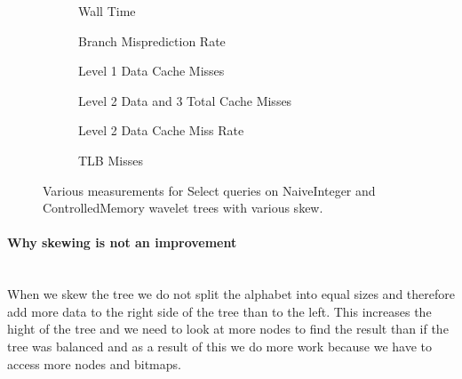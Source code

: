 \begin{figure}\tiny
\begin{subfigure}{0.48\textwidth}
	
	\caption{Wall Time}
	\label{fig:NaiveSelectSkewRunningTime}
\end{subfigure}
\hfill
\begin{subfigure}{0.48\textwidth}
	
	\caption{Branch Misprediction Rate}
	\label{fig:NaiveVsControlledNodeMemorySkewSelectQueryBMrate}
\end{subfigure}

\begin{subfigure}{0.48\textwidth}
	
	\caption{Level 1 Data Cache Misses}
	\label{fig:L1NaiveControlledNodeMemorySelectSkewCacheMisses}
\end{subfigure}
\hfill
\begin{subfigure}{0.48\textwidth}
 	
	\caption{Level 2 Data and 3 Total Cache Misses}
	\label{fig:L2L3NaiveControlledNodeMemorySelectSkewCacheMisses}
\end{subfigure}

\begin{subfigure}{0.48\textwidth}
	
	\caption{Level 2 Data Cache Miss Rate}
	\label{fig:NaiveVsControlledNodeMemorySkewSelectQuery_L2_DCMrate}
\end{subfigure}
\hfill
\begin{subfigure}{0.48\textwidth}
	
	\caption{TLB Misses}
	\label{fig:NaiveVsControlledNodeMemorySkewSelectQueryTLB}
\end{subfigure}

\caption{Various measurements for Select queries on NaiveInteger and ControlledMemory wavelet trees with various skew.}
\label{fig:NaiveVsControlledNodeMemorySkewSelectQuery}

\end{figure}


\restoregeometry



\paragraph{Why skewing is not an improvement}~\\
When we skew the tree we do not split the alphabet into equal sizes and therefore add more data to the right side of the tree than to the left. 
This increases the hight of the tree and we need to look at more nodes to find the result than if the tree was balanced and as a result of this we do more work because we have to access more nodes and bitmaps.

